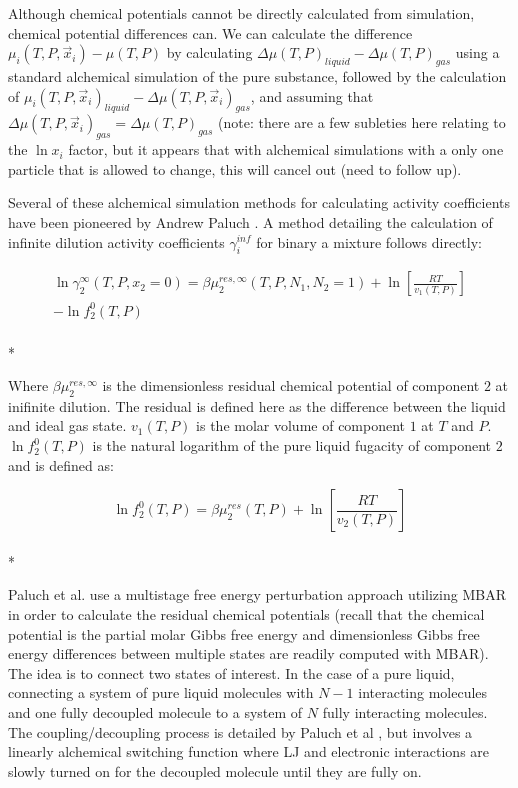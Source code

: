 \documentclass[aps,pre,twocolumn,nofootinbib,superscriptaddress,linenumbers,10pt, draft,tightenlines]{revtex4-1}
\begin{document}
Although chemical potentials cannot be directly calculated from
simulation, chemical potential differences can. We can calculate the
difference $\mu_i(T,P,\vec{x}_i) - \mu(T,P)$ by calculating $\Delta
\mu(T,P)_{liquid} - \Delta \mu(T,P)_{gas}$ using a standard alchemical
simulation of the pure substance, followed by the calculation of
$\mu_i(T,P,\vec{x}_i)_{liquid} - \Delta \mu(T,P,\vec{x}_i)_{gas}$, and
assuming that $\Delta \mu(T,P,\vec{x}_i)_{gas} = \Delta
\mu(T,P)_{gas}$ (note: there are a few subleties here relating to the
$\ln x_i$ factor, but it appears that with alchemical simulations with
a only one particle that is allowed to change, this will cancel out
(need to follow up).

Several of these alchemical simulation methods for calculating activity coefficients have been pioneered by Andrew Paluch \cite{paluch1}. A method detailing the calculation of infinite dilution activity coefficients $\gamma_i^{inf}$ for binary a mixture follows directly:

\begin{multline}
\ln\gamma_2^{\infty}\left(T,P,x_2 = 0\right) = \beta \mu_2^{res,\infty}\left(T,P,N_1,N_2 = 1\right) + \ln\left[\frac{R T}{v_1\left(T,P\right)}\right] \\ - \ln f_2^0\left(T,P\right)
\end{multline}\\*

Where $\beta\mu_2^{res,\infty}$ is the dimensionless residual chemical potential of component $2$ at inifinite dilution. The residual is defined here as the difference between the liquid and ideal gas state. $v_1\left(T,P\right)$ is the molar volume of component $1$ at $T$ and $P$. $\ln f_2^0\left(T,P\right)$ is the natural logarithm of the pure liquid fugacity of component $2$ and is defined as:

\begin{equation}\ln f_2^0\left(T,P\right) = \beta\mu_2^{res}\left(T,P\right) + \ln\left[\frac{R T}{v_2\left(T,P\right)}\right]\end{equation}\\*

Paluch et al. use a multistage free energy perturbation approach utilizing MBAR in order to calculate the residual chemical potentials (recall that the chemical potential is the partial molar Gibbs free energy and dimensionless Gibbs free energy differences between multiple states are readily computed with MBAR). The idea is to connect two states of interest. In the case of a pure liquid, connecting a system of pure liquid molecules with $N - 1$ interacting molecules and one fully decoupled molecule to a system of $N$ fully interacting molecules. The coupling/decoupling process is detailed by Paluch et al \cite{paluch0}, but involves a linearly alchemical switching function where LJ and electronic interactions are slowly turned on for the decoupled molecule until they are fully on.     
\end{document}

